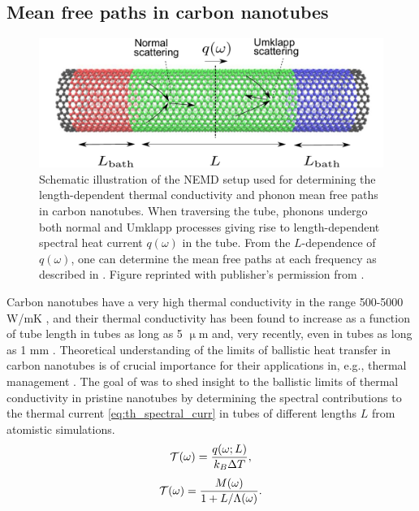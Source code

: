 \subsection{Mean free paths in carbon nanotubes}

\label{sec:results_mfps}

\begin{figure}[tb]
 \begin{center}
  \includegraphics[width=.89\columnwidth]{pics/cnt_fig1-crop.pdf} 
  \caption{Schematic illustration of the NEMD setup used for determining the length-dependent thermal conductivity and phonon mean free paths in carbon nanotubes. When traversing the tube, phonons undergo both normal and Umklapp processes giving rise to length-dependent spectral heat current $q(\omega)$ in the tube. From the $L$-dependence of $q(\omega)$, one can determine the mean free paths at each frequency as described in . Figure reprinted with publisher's permission from .}  
\label{fig:cnt_fig1}
 \end{center}
\end{figure}

Carbon nanotubes have a very high thermal conductivity in the range 500-5000 W/mK \cite{marconnet13}, and their thermal conductivity has been found to increase as a function of tube length in tubes as long as 5 $\upmu$m \cite{chang08} and, very recently, even in tubes as long as 1 mm \cite{chang_personal}. Theoretical understanding of the limits of ballistic heat transfer in carbon nanotubes is of crucial importance for their applications in, e.g., thermal management \cite{biercuk02,huang05}. The goal of  was to shed insight to the ballistic limits of thermal conductivity in pristine nanotubes by determining the spectral contributions to the thermal current \eqref{eq:th_spectral_curr} in tubes of different lengths $L$ from atomistic simulations. 
\begin{equation}
 \mathcal{T}(\omega) = \frac{q(\omega;L)}{k_B \Delta T}, \label{eq:Tomega_L}
\end{equation}
\cite{datta,wang06_apl,savic08_prl}
\begin{equation}
 \mathcal{T}(\omega) = \frac{M(\omega)}{1+L/\Lambda(\omega)}.
\end{equation}

